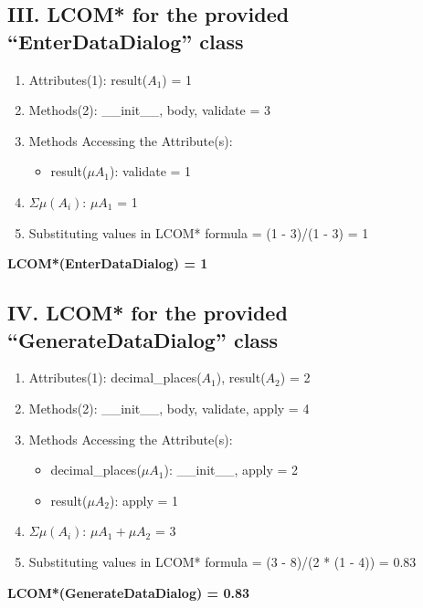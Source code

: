 \documentclass[english,12pt,a4paper]{report}
\begin{document}
	\subsection*{III. LCOM* for the provided ``EnterDataDialog'' class}
	\begin{enumerate}[label=\arabic*.]
		\item Attributes(1): result(\(A_1\)) = 1
		\item Methods(2): \_\_init\_\_, body, validate = 3
		\item Methods Accessing the Attribute(s):
		\begin{itemize}[label={$\bullet$}]
			\item result(\(\mu A_1\)): validate = 1
		\end{itemize}
		\item \(\Sigma\mu(A_i)\): \(\mu A_1\) = 1
		\item Substituting values in LCOM* formula = (1 - 3)/(1 - 3) = 1
	\end{enumerate}
	\textbf{LCOM*(EnterDataDialog) = 1}
	
	\subsection*{IV. LCOM* for the provided ``GenerateDataDialog'' class}
	\begin{enumerate}[label=\arabic*.]
		\item Attributes(1): decimal\_places(\(A_1\)), result(\(A_2\)) = 2
		\item Methods(2): \_\_init\_\_, body, validate, apply = 4
		\item Methods Accessing the Attribute(s):
		\begin{itemize}[label={$\bullet$}]
			\item decimal\_places(\(\mu A_1\)): \_\_init\_\_, apply = 2
			\item result(\(\mu A_2\)): apply = 1
		\end{itemize}
		\item \(\Sigma\mu(A_i)\): \(\mu A_1 + \mu A_2\) = 3
		\item Substituting values in LCOM* formula = (3 - 8)/(2 * (1 - 4)) = 0.83
	\end{enumerate}
	\textbf{LCOM*(GenerateDataDialog) = 0.83}
	
\end{document}
